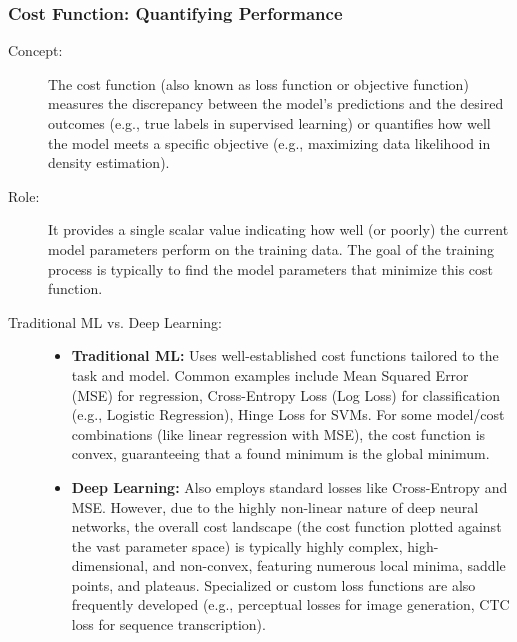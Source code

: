 \documentclass{article}
\begin{document}
\subsubsection{Cost Function: Quantifying Performance}
\begin{description}
    \item[Concept:] The cost function (also known as loss function or objective function) measures the discrepancy between the model's predictions and the desired outcomes (e.g., true labels in supervised learning) or quantifies how well the model meets a specific objective (e.g., maximizing data likelihood in density estimation).

    \item[Role:] It provides a single scalar value indicating how well (or poorly) the current model parameters perform on the training data. The goal of the training process is typically to find the model parameters that minimize this cost function.

    \item[Traditional ML vs. Deep Learning:]
        \begin{itemize}
            \item \textbf{Traditional ML:} Uses well-established cost functions tailored to the task and model. Common examples include Mean Squared Error (MSE) for regression, Cross-Entropy Loss (Log Loss) for classification (e.g., Logistic Regression), Hinge Loss for SVMs. For some model/cost combinations (like linear regression with MSE), the cost function is convex, guaranteeing that a found minimum is the global minimum.
            \item \textbf{Deep Learning:} Also employs standard losses like Cross-Entropy and MSE. However, due to the highly non-linear nature of deep neural networks, the overall cost landscape (the cost function plotted against the vast parameter space) is typically highly complex, high-dimensional, and non-convex, featuring numerous local minima, saddle points, and plateaus. Specialized or custom loss functions are also frequently developed (e.g., perceptual losses for image generation, CTC loss for sequence transcription).
        \end{itemize}
\end{description}
\end{document}
